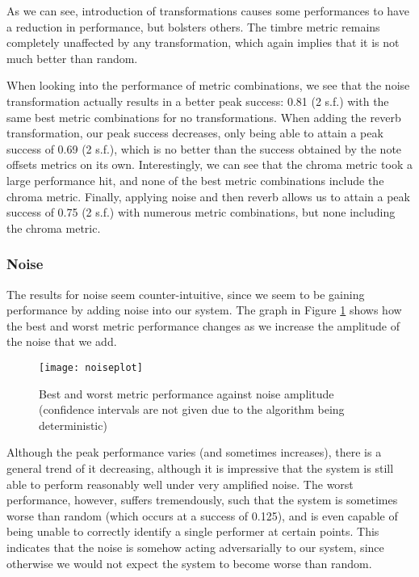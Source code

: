 \documentclass[oneside, class=book, 12pt, crop=false]{standalone}
\begin{document}

As we can see, introduction of transformations causes some performances to have a reduction in performance, but bolsters others. The timbre metric remains completely unaffected by any transformation, which again implies that it is not much better than random.

When looking into the performance of metric combinations, we see that the noise transformation actually results in a better peak success: 0.81 (2 s.f.) with the same best metric combinations for no transformations. When adding the reverb transformation, our peak success decreases, only being able to attain a peak success of 0.69 (2 s.f.), which is no better than the success obtained by the note offsets metrics on its own. Interestingly, we can see that the chroma metric took a large performance hit, and none of the best metric combinations include the chroma metric. Finally, applying noise and then reverb allows us to attain a peak success of 0.75 (2 s.f.) with numerous metric combinations, but none including the chroma metric.

\subsubsection{Noise}

The results for noise seem counter-intuitive, since we seem to be gaining performance by adding noise into our system. The graph in Figure \ref{fig:noiseplot} shows how the best and worst metric performance changes as we increase the amplitude of the noise that we add.

\begin{figure}[h]
    \captionsetup{justification=centering}
    \centering
    \texttt{[image: noiseplot]}
    \caption{Best and worst metric performance against noise amplitude (confidence intervals are not given due to the algorithm being deterministic)}
    \label{fig:noiseplot}
\end{figure}

Although the peak performance varies (and sometimes increases), there is a general trend of it decreasing, although it is impressive that the system is still able to perform reasonably well under very amplified noise. The worst performance, however, suffers tremendously, such that the system is sometimes worse than random (which occurs at a success of 0.125), and is even capable of being unable to correctly identify a single performer at certain points. This indicates that the noise is somehow acting adversarially to our system, since otherwise we would not expect the system to become worse than random.
\end{document}
